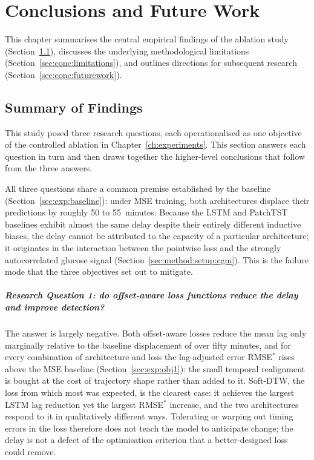 \chapter{Conclusions and Future Work}
\label{ch:conclusions}

This chapter summarises the central empirical findings of the ablation study (Section~\ref{sec:conc:summary}), discusses the underlying methodological limitations (Section~\ref{sec:conc:limitations}), and outlines directions for subsequent research (Section~\ref{sec:conc:futurework}).

\section{Summary of Findings}
\label{sec:conc:summary}

This study posed three research questions, each operationalised as one objective of the controlled ablation in Chapter~\ref{ch:experiments}. This section answers each question in turn and then draws together the higher-level conclusions that follow from the three answers.

All three questions share a common premise established by the baseline (Section~\ref{sec:exp:baseline}): under MSE training, both architectures displace their predictions by roughly 50 to 55~minutes. Because the LSTM and PatchTST baselines exhibit almost the same delay despite their entirely different inductive biases, the delay cannot be attributed to the capacity of a particular architecture; it originates in the interaction between the pointwise loss and the strongly autocorrelated glucose signal (Section~\ref{sec:method:setup:cgm}). This is the failure mode that the three objectives set out to mitigate.

\paragraph{Research Question 1: do offset-aware loss functions reduce the delay and improve detection?}
The answer is largely negative. Both offset-aware losses reduce the mean lag only marginally relative to the baseline displacement of over fifty minutes, and for every combination of architecture and loss the lag-adjusted error RMSE$^*$ rises above the MSE baseline (Section~\ref{sec:exp:obj1}): the small temporal realignment is bought at the cost of trajectory shape rather than added to it. Soft-DTW, the loss from which most was expected, is the clearest case: it achieves the largest LSTM lag reduction yet the largest RMSE$^*$ increase, and the two architectures respond to it in qualitatively different ways. Tolerating or warping out timing errors in the loss therefore does not teach the model to anticipate change; the delay is not a defect of the optimisation criterion that a better-designed loss could remove.


